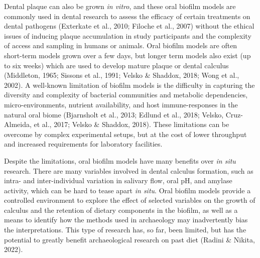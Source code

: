 \documentclass[
]{article}
\begin{document}
Dental plaque can also be grown \emph{in vitro}, and these oral biofilm
models are commonly used in dental research to assess the efficacy of
certain treatments on dental pathogens (Exterkate et al., 2010; Filoche
et al., 2007) without the ethical issues of inducing plaque accumulation
in study participants and the complexity of access and sampling in
humans or animals. Oral biofilm models are often short-term models grown
over a few days, but longer term models also exist (up to six weeks)
which are used to develop mature plaque or dental calculus (Middleton,
1965; Sissons et al., 1991; Velsko \& Shaddox, 2018; Wong et al., 2002).
A well-known limitation of biofilm models is the difficulty in capturing
the diversity and complexity of bacterial communities and metabolic
dependencies, micro-environments, nutrient availability, and host
immune-responses in the natural oral biome (Bjarnsholt et al., 2013;
Edlund et al., 2018; Velsko, Cruz-Almeida, et al., 2017; Velsko \&
Shaddox, 2018). These limitations can be overcome by complex
experimental setups, but at the cost of lower throughput and increased
requirements for laboratory facilities.

Despite the limitations, oral biofilm models have many benefits over
\emph{in situ} research. There are many variables involved in dental
calculus formation, such as intra- and inter-individual variation in
salivary flow, oral pH, and amylase activity, which can be hard to tease
apart \emph{in situ}. Oral biofilm models provide a controlled
environment to explore the effect of selected variables on the growth of
calculus and the retention of dietary components in the biofilm, as well
as a means to identify how the methods used in archaeology may
inadvertently bias the interpretations. This type of research has, so
far, been limited, but has the potential to greatly benefit
archaeological research on past diet (Radini \& Nikita, 2022).
\end{document}
